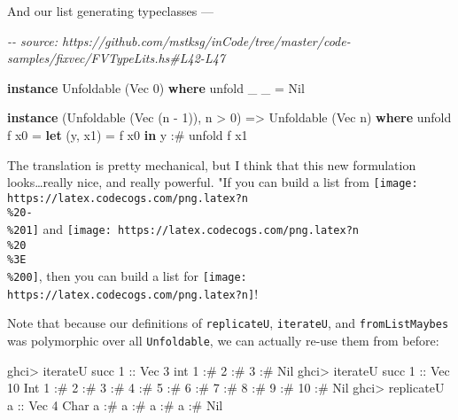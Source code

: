 \documentclass[]{article}
\newenvironment{Shaded}{}{}
\newcommand{\CharTok}[1]{\textcolor[rgb]{0.25,0.44,0.63}{#1}}
\newcommand{\CommentTok}[1]{\textcolor[rgb]{0.38,0.63,0.69}{\textit{#1}}}
\newcommand{\DataTypeTok}[1]{\textcolor[rgb]{0.56,0.13,0.00}{#1}}
\newcommand{\DecValTok}[1]{\textcolor[rgb]{0.25,0.63,0.44}{#1}}
\newcommand{\FunctionTok}[1]{\textcolor[rgb]{0.02,0.16,0.49}{#1}}
\newcommand{\KeywordTok}[1]{\textcolor[rgb]{0.00,0.44,0.13}{\textbf{#1}}}
\newcommand{\NormalTok}[1]{#1}
\newcommand{\OperatorTok}[1]{\textcolor[rgb]{0.40,0.40,0.40}{#1}}
\newcommand{\OtherTok}[1]{\textcolor[rgb]{0.00,0.44,0.13}{#1}}
\begin{document}
And our list generating typeclasses ---

\begin{Shaded}
\begin{Highlighting}[]
\CommentTok{{-}{-} source: https://github.com/mstksg/inCode/tree/master/code{-}samples/fixvec/FVTypeLits.hs\#L42{-}L47}

\KeywordTok{instance} \DataTypeTok{Unfoldable}\NormalTok{ (}\DataTypeTok{Vec} \DecValTok{0}\NormalTok{) }\KeywordTok{where}
\NormalTok{    unfold \_ \_ }\OtherTok{=} \DataTypeTok{Nil}

\KeywordTok{instance}\NormalTok{ (}\DataTypeTok{Unfoldable}\NormalTok{ (}\DataTypeTok{Vec}\NormalTok{ (n }\OperatorTok{{-}} \DecValTok{1}\NormalTok{)), n }\OperatorTok{>} \DecValTok{0}\NormalTok{) }\OtherTok{=>} \DataTypeTok{Unfoldable}\NormalTok{ (}\DataTypeTok{Vec}\NormalTok{ n) }\KeywordTok{where}
\NormalTok{    unfold f x0 }\OtherTok{=} \KeywordTok{let}\NormalTok{ (y, x1) }\OtherTok{=}\NormalTok{ f x0}
                  \KeywordTok{in}\NormalTok{  y }\OperatorTok{:\#}\NormalTok{ unfold f x1}
\end{Highlighting}
\end{Shaded}

The translation is pretty mechanical, but I think that this new formulation
looks\ldots really nice, and really powerful. "If you can build a list from
\texttt{[image: https://latex.codecogs.com/png.latex?n\\\%20-\\\%201]} and
\texttt{[image: https://latex.codecogs.com/png.latex?n\\\%20\\\%3E\\\%200]}, then you
can build a list for \texttt{[image: https://latex.codecogs.com/png.latex?n]}!

Note that because our definitions of \texttt{replicateU}, \texttt{iterateU}, and
\texttt{fromListMaybes} was polymorphic over all \texttt{Unfoldable}, we can
actually re-use them from before:

\begin{Shaded}
\begin{Highlighting}[]
\NormalTok{ghci}\OperatorTok{>}\NormalTok{ iterateU }\FunctionTok{succ} \DecValTok{1}\OtherTok{ ::} \DataTypeTok{Vec} \DecValTok{3}\NormalTok{ int}
\DecValTok{1} \OperatorTok{:\#} \DecValTok{2} \OperatorTok{:\#} \DecValTok{3} \OperatorTok{:\#} \DataTypeTok{Nil}
\NormalTok{ghci}\OperatorTok{>}\NormalTok{ iterateU }\FunctionTok{succ} \DecValTok{1}\OtherTok{ ::} \DataTypeTok{Vec} \DecValTok{10} \DataTypeTok{Int}
\DecValTok{1} \OperatorTok{:\#} \DecValTok{2} \OperatorTok{:\#} \DecValTok{3} \OperatorTok{:\#} \DecValTok{4} \OperatorTok{:\#} \DecValTok{5} \OperatorTok{:\#} \DecValTok{6} \OperatorTok{:\#} \DecValTok{7} \OperatorTok{:\#} \DecValTok{8} \OperatorTok{:\#} \DecValTok{9} \OperatorTok{:\#} \DecValTok{10} \OperatorTok{:\#} \DataTypeTok{Nil}
\NormalTok{ghci}\OperatorTok{>}\NormalTok{ replicateU }\CharTok{\textquotesingle{}a\textquotesingle{}}\OtherTok{ ::} \DataTypeTok{Vec} \DecValTok{4} \DataTypeTok{Char}
\CharTok{\textquotesingle{}a\textquotesingle{}} \OperatorTok{:\#} \CharTok{\textquotesingle{}a\textquotesingle{}} \OperatorTok{:\#} \CharTok{\textquotesingle{}a\textquotesingle{}} \OperatorTok{:\#} \CharTok{\textquotesingle{}a\textquotesingle{}} \OperatorTok{:\#} \DataTypeTok{Nil}
\end{Highlighting}
\end{Shaded}
\end{document}
